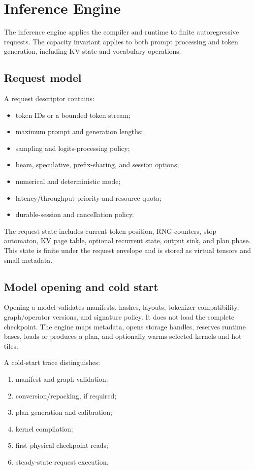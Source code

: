 \section{Inference Engine}
\label{sec:inference}

The inference engine applies the compiler and runtime to finite autoregressive requests. The capacity invariant applies to both prompt processing and token generation, including KV state and vocabulary operations.

\subsection{Request model}

A request descriptor contains:

\begin{itemize}
  \item token IDs or a bounded token stream;
  \item maximum prompt and generation lengths;
  \item sampling and logits-processing policy;
  \item beam, speculative, prefix-sharing, and session options;
  \item numerical and deterministic mode;
  \item latency/throughput priority and resource quota;
  \item durable-session and cancellation policy.
\end{itemize}

The request state includes current token position, RNG counters, stop automaton, KV page table, optional recurrent state, output sink, and plan phase. This state is finite under the request envelope and is stored as virtual tensors and small metadata.

\subsection{Model opening and cold start}

Opening a model validates manifests, hashes, layouts, tokenizer compatibility, graph/operator versions, and signature policy. It does not load the complete checkpoint. The engine maps metadata, opens storage handles, reserves runtime bases, loads or produces a plan, and optionally warms selected kernels and hot tiles.

A cold-start trace distinguishes:

\begin{enumerate}
  \item manifest and graph validation;
  \item conversion/repacking, if required;
  \item plan generation and calibration;
  \item kernel compilation;
  \item first physical checkpoint reads;
  \item steady-state request execution.
\end{enumerate}

